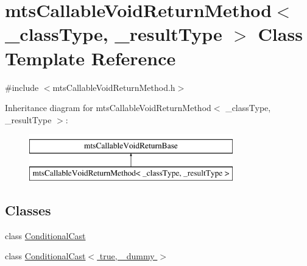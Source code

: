 \hypertarget{classmts_callable_void_return_method}{}\section{mts\+Callable\+Void\+Return\+Method$<$ \+\_\+class\+Type, \+\_\+result\+Type $>$ Class Template Reference}
\label{classmts_callable_void_return_method}


{\ttfamily \#include $<$mts\+Callable\+Void\+Return\+Method.\+h$>$}

Inheritance diagram for mts\+Callable\+Void\+Return\+Method$<$ \+\_\+class\+Type, \+\_\+result\+Type $>$\+:\begin{figure}[H]
\begin{center}
\leavevmode
\includegraphics[height=2.000000cm]{d1/d1f/classmts_callable_void_return_method}
\end{center}
\end{figure}
\subsection*{Classes}
\begin{DoxyCompactItemize}
\item 
class \hyperlink{classmts_callable_void_return_method_1_1_conditional_cast}{Conditional\+Cast}
\item 
class \hyperlink{classmts_callable_void_return_method_1_1_conditional_cast_3_01true_00_01__dummy_01_4}{Conditional\+Cast$<$ true, \+\_\+dummy $>$}
\end{DoxyCompactItemize}
